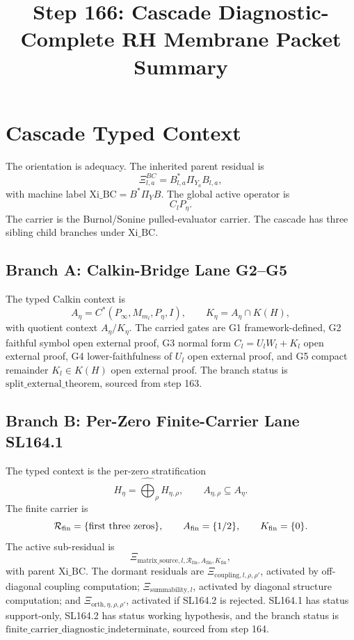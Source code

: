 \documentclass[11pt]{article}
\newcommand{\XiBC}{\Xi^{BC}_{l,a}}
\newcommand{\Aeta}{A_\eta}
\newcommand{\Keta}{K_\eta}
\newcommand{\Rhofin}{\mathcal R_{\mathrm{fin}}}
\begin{document}
\title{Step 166: Cascade Diagnostic-Complete RH Membrane Packet Summary}
\author{}
\date{}
\maketitle

\section{Cascade Typed Context}

The orientation is adequacy. The inherited parent residual is
\[
\XiBC=B^*_{l,a}\Pi_{Y_a}B_{l,a},
\]
with machine label \(\mathrm{Xi\_BC}=B^*\Pi_YB\). The global active operator is
\[
C_lP_\eta .
\]
The carrier is the Burnol/Sonine pulled-evaluator carrier. The cascade has three sibling child branches under \(\mathrm{Xi\_BC}\).

\subsection{Branch A: Calkin-Bridge Lane G2--G5}

The typed Calkin context is
\[
\Aeta=C^*(P_\infty,M_{m_l},P_\eta,I),\qquad
\Keta=\Aeta\cap K(H),
\]
with quotient context \(\Aeta/\Keta\). The carried gates are G1 framework-defined, G2 faithful symbol open external proof, G3 normal form \(C_l=U_lW_l+K_l\) open external proof, G4 lower-faithfulness of \(U_l\) open external proof, and G5 compact remainder \(K_l\in K(H)\) open external proof. The branch status is \(\mathrm{split\_external\_theorem}\), sourced from step 163.

\subsection{Branch B: Per-Zero Finite-Carrier Lane SL164.1}

The typed context is the per-zero stratification
\[
H_\eta=\widehat{\bigoplus}_{\rho}H_{\eta,\rho},\qquad
A_{\eta,\rho}\subseteq A_\eta .
\]
The finite carrier is
\[
\Rhofin=\{\hbox{first three zeros}\},\qquad
A_{\mathrm{fin}}=\{1/2\},\qquad
K_{\mathrm{fin}}=\{0\}.
\]
The active sub-residual is
\[
\Xi_{\mathrm{matrix\_source},l,\Rhofin,A_{\mathrm{fin}},K_{\mathrm{fin}}},
\]
with parent \(\mathrm{Xi\_BC}\). The dormant residuals are
\(\Xi_{\mathrm{coupling},l,\rho,\rho'}\), activated by off-diagonal coupling computation;
\(\Xi_{\mathrm{summability},l}\), activated by diagonal structure computation; and
\(\Xi_{\mathrm{orth},\eta,\rho,\rho'}\), activated if SL164.2 is rejected. SL164.1 has status support-only, SL164.2 has status working hypothesis, and the branch status is \(\mathrm{finite\_carrier\_diagnostic\_indeterminate}\), sourced from step 164.
\end{document}
